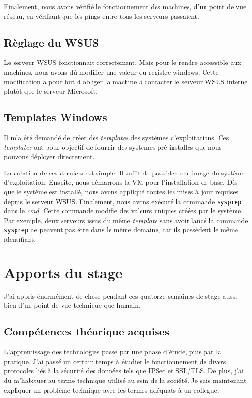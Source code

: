 Finalement, nous avons vérifié le fonctionnement des machines, d'un point de vue réseau, en vérifiant que les pings entre tous les serveurs passaient. 


\subsection{Règlage du WSUS}
Le serveur WSUS fonctionnait correctement.
Mais pour le rendre accessible aux machines, nous avons dû modifier une valeur du registre windows.
Cette modification a pour but d'obliger la machine à contacter le serveur WSUS interne plutôt que le serveur Microsoft. 

\subsection{Templates Windows}
Il m'a été demandé de créer des \textit{templates} des systèmes d'exploitations.
Ces \textit{templates} ont pour objectif de fournir des systèmes pré-installés que nous pouvons déployer directement.

La création de ces derniers est simple. 
Il suffit de posséder une image du système d'exploitation.
Ensuite, nous démarrons la VM pour l'installation de base. 
Dès que le système est installé, nous avons appliqué toutes les mises à jour requises depuis le serveur WSUS. 
Finalement, nous avons exécuté la commande \texttt{sysprep} dans le \textit{cmd}.
Cette commande modifie des valeurs uniques créées par le système.
Par exemple, deux serveurs issus du même \textit{template} sans avoir lancé la commande \texttt{sysprep} ne peuvent pas être dans le même domaine, car ils possèdent le même identifiant. 


\section{Apports du stage}
J'ai appris énormément de chose pendant ces quatorze semaines de stage aussi bien d'un point de vue technique que humain.

\subsection{Compétences théorique acquises}
L'apprentissage des technologies passe par une phase d'étude, puis par la pratique.
J'ai passé un certain temps à étudier le fonctionnement de divers protocoles liés à la sécurité des données tels que IPSec et SSL/TLS.
De plus, j'ai du m'habituer au terme technique utilisé au sein de la société.
Je sais maintenant expliquer un problème technique avec les termes adéquats à un collègue.


